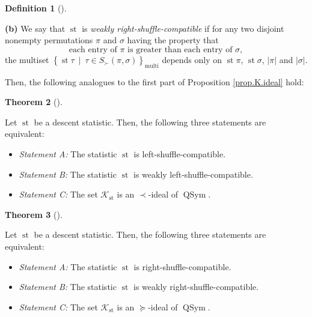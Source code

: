 \documentclass[numbers=enddot,12pt,final,onecolumn,notitlepage]{scrartcl}%
\theoremstyle{definition}
\newtheorem{theo}{Theorem}[section]
\newenvironment{theorem}[1][]
{\begin{theo}[#1]\begin{leftbar}}
{\end{leftbar}\end{theo}}
\newtheorem{defi}[theo]{Definition}
\newenvironment{definition}[1][]
{\begin{defi}[#1]\begin{leftbar}}
{\end{leftbar}\end{defi}}
\newenvironment{verlong}{}{}
\begin{document}
\begin{verlong}
\begin{definition}
\textbf{(b)} We say that $\operatorname{st}$ is \textit{weakly
right-shuffle-compatible} if for any two disjoint nonempty permutations $\pi$
and $\sigma$ having the property that%
\[
\text{each entry of }\pi\text{ is greater than each entry of }\sigma,
\]
the multiset $\left\{  \operatorname{st} \tau   \ \mid\ \tau\in
S_{\succ}\left(  \pi,\sigma\right)  \right\}  _{\operatorname*{multi}}$
depends only on $\operatorname{st} \pi$, $\operatorname{st} \sigma$,
$\left\vert \pi\right\vert $ and $\left\vert \sigma\right\vert $.
\end{definition}

Then, the following analogues to the first part of Proposition
\ref{prop.K.ideal} hold:

\begin{theorem}
\label{thm.dendri.K.ideal}Let $\operatorname{st}$ be a descent statistic.
Then, the following three statements are equivalent:

\begin{itemize}
\item \textit{Statement A:} The statistic $\operatorname{st}$ is left-shuffle-compatible.

\item \textit{Statement B:} The statistic $\operatorname{st}$ is weakly left-shuffle-compatible.

\item \textit{Statement C:} The set $\mathcal{K}_{\operatorname{st}}$ is an
$\left.  \prec\right.  $-ideal of $\operatorname*{QSym}$.
\end{itemize}
\end{theorem}

\begin{theorem}
\label{thm.dendri.K.ideal-R}Let $\operatorname{st}$ be a descent statistic.
Then, the following three statements are equivalent:

\begin{itemize}
\item \textit{Statement A:} The statistic $\operatorname{st}$ is right-shuffle-compatible.

\item \textit{Statement B:} The statistic $\operatorname{st}$ is weakly right-shuffle-compatible.

\item \textit{Statement C:} The set $\mathcal{K}_{\operatorname{st}}$ is an
$\left.  \succeq\right.  $-ideal of $\operatorname*{QSym}$.
\end{itemize}
\end{theorem}


\end{verlong}
\end{document}

